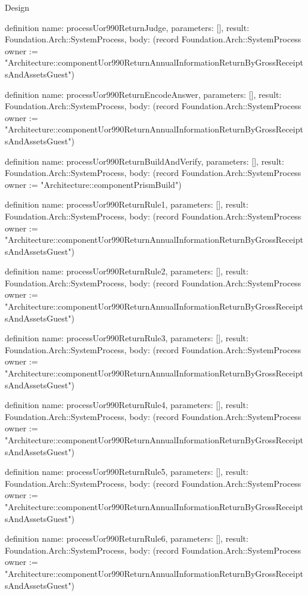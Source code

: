 \begin{lexlean}{Design}
\begin{semanticmodule}
definition{
  name: processUor990ReturnJudge,
  parameters: [],
  result: Foundation.Arch::SystemProcess,
  body: (record Foundation.Arch::SystemProcess {owner := "Architecture::componentUor990ReturnAnnualInformationReturnByGrossReceiptsAndAssetsGuest"})
}

definition{
  name: processUor990ReturnEncodeAnswer,
  parameters: [],
  result: Foundation.Arch::SystemProcess,
  body: (record Foundation.Arch::SystemProcess {owner := "Architecture::componentUor990ReturnAnnualInformationReturnByGrossReceiptsAndAssetsGuest"})
}

definition{
  name: processUor990ReturnBuildAndVerify,
  parameters: [],
  result: Foundation.Arch::SystemProcess,
  body: (record Foundation.Arch::SystemProcess {owner := "Architecture::componentPrismBuild"})
}

definition{
  name: processUor990ReturnRule1,
  parameters: [],
  result: Foundation.Arch::SystemProcess,
  body: (record Foundation.Arch::SystemProcess {owner := "Architecture::componentUor990ReturnAnnualInformationReturnByGrossReceiptsAndAssetsGuest"})
}

definition{
  name: processUor990ReturnRule2,
  parameters: [],
  result: Foundation.Arch::SystemProcess,
  body: (record Foundation.Arch::SystemProcess {owner := "Architecture::componentUor990ReturnAnnualInformationReturnByGrossReceiptsAndAssetsGuest"})
}

definition{
  name: processUor990ReturnRule3,
  parameters: [],
  result: Foundation.Arch::SystemProcess,
  body: (record Foundation.Arch::SystemProcess {owner := "Architecture::componentUor990ReturnAnnualInformationReturnByGrossReceiptsAndAssetsGuest"})
}

definition{
  name: processUor990ReturnRule4,
  parameters: [],
  result: Foundation.Arch::SystemProcess,
  body: (record Foundation.Arch::SystemProcess {owner := "Architecture::componentUor990ReturnAnnualInformationReturnByGrossReceiptsAndAssetsGuest"})
}

definition{
  name: processUor990ReturnRule5,
  parameters: [],
  result: Foundation.Arch::SystemProcess,
  body: (record Foundation.Arch::SystemProcess {owner := "Architecture::componentUor990ReturnAnnualInformationReturnByGrossReceiptsAndAssetsGuest"})
}

definition{
  name: processUor990ReturnRule6,
  parameters: [],
  result: Foundation.Arch::SystemProcess,
  body: (record Foundation.Arch::SystemProcess {owner := "Architecture::componentUor990ReturnAnnualInformationReturnByGrossReceiptsAndAssetsGuest"})
}


\end{semanticmodule}
\end{lexlean}

